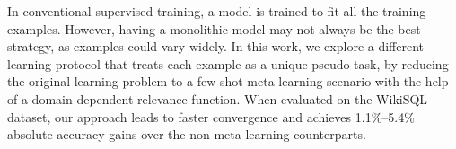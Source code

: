 In conventional supervised training, a model is trained to fit all the training examples. However, having a monolithic model may not always be the best strategy, as examples could vary widely. In this work, we explore a different learning protocol that treats each example as a unique pseudo-task, by reducing the original learning problem to a few-shot meta-learning scenario with the help of a domain-dependent relevance function. When evaluated on the WikiSQL dataset, our approach leads to faster convergence and achieves 1.1\%--5.4\% absolute accuracy gains over the non-meta-learning counterparts.
